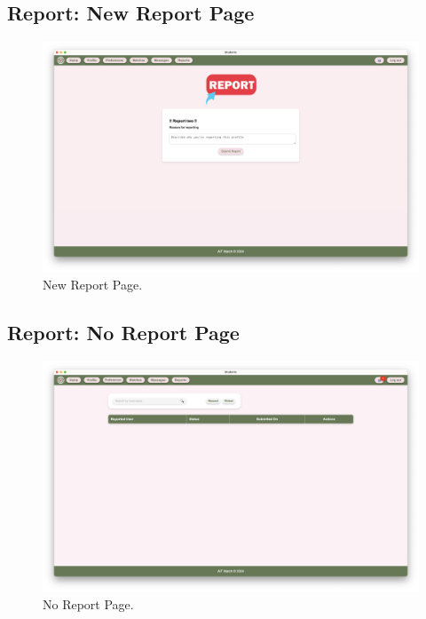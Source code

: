         \subsection{Report: New Report Page}
        \begin{figure}[h]
                \centering
                \captionsetup{justification=centering, singlelinecheck=false, labelsep=space}
                \includegraphics[width=5in]{figures/results/reports/report-new-page.png}
                \caption{New Report Page.}
                \label{fig:report-new-page}
            \end{figure}

        \newpage
        \subsection{Report: No Report Page}
        \begin{figure}[h]
                \centering
                \captionsetup{justification=centering, singlelinecheck=false, labelsep=space}
                \includegraphics[width=5in]{figures/results/reports/no-reports-page.png}
                \caption{No Report Page.}
                \label{fig:no-reports-page}
            \end{figure}

